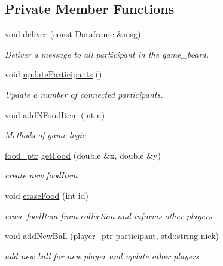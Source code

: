 \subsection*{Private Member Functions}
\begin{DoxyCompactItemize}
\item 
void \hyperlink{classwebsocket_1_1GameBoard_a66d8b6bfa24c4902896acff4e49f3dc5}{deliver} (const \hyperlink{structwebsocket_1_1Dataframe}{Dataframe} \&msg)
\begin{DoxyCompactList}\small\item\em Deliver a message to all participant in the game\+\_\+board. \end{DoxyCompactList}\item 
void \hyperlink{classwebsocket_1_1GameBoard_a9d97f5e5069d0501ea37cb819d481dd0}{update\+Participants} ()
\begin{DoxyCompactList}\small\item\em Update a number of connected participants. \end{DoxyCompactList}\item 
void \hyperlink{classwebsocket_1_1GameBoard_a4bcaa4bcf0a260efa6baffec4e72990e}{add\+N\+Food\+Item} (int n)
\begin{DoxyCompactList}\small\item\em Methods of game logic. \end{DoxyCompactList}\item 
\hyperlink{namespacewebsocket_a198017789b8c5fa32315a12d5ce97869}{food\+\_\+ptr} \hyperlink{classwebsocket_1_1GameBoard_a3a0cacc2c9a90a5752a8b29ea243c9af}{get\+Food} (double \&x, double \&y)
\begin{DoxyCompactList}\small\item\em create new food\+Item \end{DoxyCompactList}\item 
void \hyperlink{classwebsocket_1_1GameBoard_a9bf63429b6e4ef6cb652eab0224fba4f}{erase\+Food} (int id)
\begin{DoxyCompactList}\small\item\em erase food\+Item from collection and informs other players \end{DoxyCompactList}\item 
void \hyperlink{classwebsocket_1_1GameBoard_a9067bf26d8aae3e4f325d866247e0951}{add\+New\+Ball} (\hyperlink{namespacewebsocket_aec8d52893bdf524a1412533a63b006a3}{player\+\_\+ptr} participant, std\+::string nick)
\begin{DoxyCompactList}\small\item\em add new ball for new player and update other players \end{DoxyCompactList}\item 

\end{DoxyCompactItemize}
